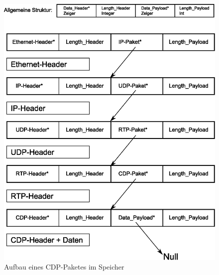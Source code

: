 \documentclass[a4paper]{book}%
\begin{document}
\begin{figure}[H]
	\centering
	\includegraphics[width=1.0\textwidth]{figures/speicherabbild.eps}
	\caption[Aufbau eines CDP-Paketes im Speicher]{Aufbau eines CDP-Paketes im Speicher}
	\label{fig:speicherabbild}
\end{figure}
\end{document}

